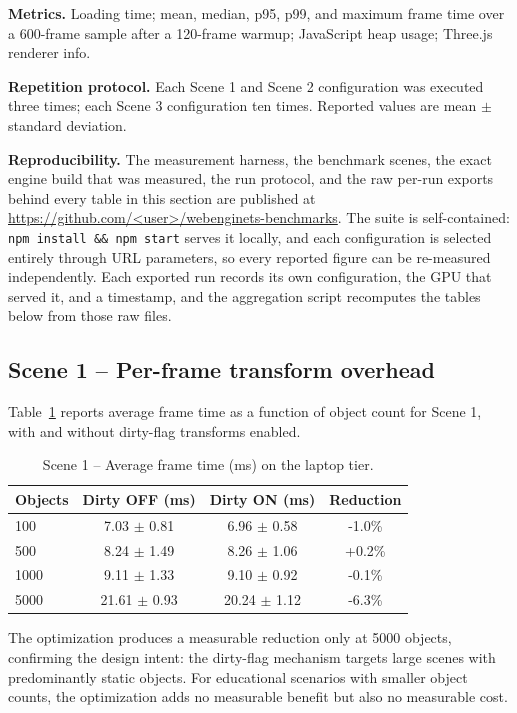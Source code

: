 \textbf{Metrics.} Loading time; mean, median, p95, p99, and maximum frame time over a 600-frame sample after a 120-frame warmup; JavaScript heap usage; Three.js renderer info.

\textbf{Repetition protocol.} Each Scene 1 and Scene 2 configuration was executed three times; each Scene 3 configuration ten times. Reported values are mean $\pm$ standard deviation.

\textbf{Reproducibility.} The measurement harness, the benchmark scenes, the exact engine build that was measured, the run protocol, and the raw per-run exports behind every table in this section are published at \url{https://github.com/<user>/webenginets-benchmarks}. The suite is self-contained: \texttt{npm install \&\& npm start} serves it locally, and each configuration is selected entirely through URL parameters, so every reported figure can be re-measured independently. Each exported run records its own configuration, the GPU that served it, and a timestamp, and the aggregation script recomputes the tables below from those raw files.

\subsection{Scene 1 -- Per-frame transform overhead}
Table~\ref{tab:scene1} reports average frame time as a function of object count for Scene 1, with and without dirty-flag transforms enabled.

\begin{table}[H]
\centering
\caption{Scene 1 -- Average frame time (ms) on the laptop tier.}
\label{tab:scene1}
\begin{tabular}{lccc}
\toprule
Objects & Dirty OFF (ms) & Dirty ON (ms) & Reduction \\
\midrule
100  & 7.03 $\pm$ 0.81 & 6.96 $\pm$ 0.58 & -1.0\% \\
500  & 8.24 $\pm$ 1.49 & 8.26 $\pm$ 1.06 & +0.2\% \\
1000 & 9.11 $\pm$ 1.33 & 9.10 $\pm$ 0.92 & -0.1\% \\
5000 & 21.61 $\pm$ 0.93 & 20.24 $\pm$ 1.12 & -6.3\% \\
\bottomrule
\end{tabular}
\end{table}

The optimization produces a measurable reduction only at 5000 objects, confirming the design intent: the dirty-flag mechanism targets large scenes with predominantly static objects. For educational scenarios with smaller object counts, the optimization adds no measurable benefit but also no measurable cost.

